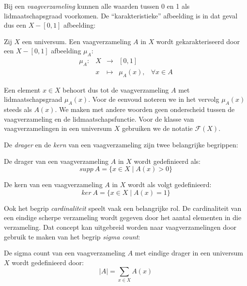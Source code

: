 Bij een \emph{vaagverzameling} kunnen alle waarden tussen 0 en 1 als lidmaatschapsgraad 
voorkomen. De ``karakteristieke'' afbeelding is in dat geval dus een $X - [0,1]$ afbeelding:
\begin{definitie}
Zij $X$ een universum. Een vaagverzameling $A$ in $X$ wordt gekarakteriseerd door een $X - [0,1]$
afbeelding  $\mu_A$:
\begin{displaymath}
\begin{array}{lllll}
\mu_A: 	& X & \to 		& [0,1]	& \\
		& x & \mapsto 	& \mu_A(x),		& \forall x \in A
\end{array}
\end{displaymath}
\end{definitie}
\noindent
Een element $x \in X$ behoort dus tot de vaagverzameling $A$ met lidmaatschapsgraad $\mu_A(x)$.
Voor de eenvoud noteren we in het vervolg $\mu_A(x)$ steeds als $A(x)$. We maken
met andere woorden geen onderscheid tussen de vaagverzameling en de 
lidmaatschapsfunctie. Voor de klasse van vaagverzamelingen in een universum $X$ gebruiken we
de notatie $\mathcal{F}(X)$.

De \emph{drager} en de \emph{kern} van een vaagverzameling zijn twee belangrijke begrippen: 
\begin{definitie}
De drager van een vaagverzameling $A$ in $X$ wordt gedefinieerd als:
\begin{displaymath}
supp\ A = \{x \in X \mid A(x) > 0\} 
\end{displaymath}
\end{definitie}
\begin{definitie}
De kern van een vaagverzameling $A$ in $X$ wordt als volgt gedefinieerd:
\begin{displaymath}
ker\ A = \{x \in X \mid A(x) = 1\}
\end{displaymath}
\end{definitie}
\noindent
Ook het begrip \emph{cardinaliteit} speelt vaak een belangrijke rol. De cardinaliteit van een 
eindige scherpe verzameling wordt gegeven door het aantal elementen in die verzameling. 
Dat concept kan uitgebreid worden naar vaagverzamelingen door gebruik te maken van het begrip 
\emph{sigma count}:
\begin{definitie}
De sigma count van een vaagverzameling $A$ met eindige drager in een universum $X$ wordt
gedefinieerd door:
\begin{displaymath}
|A|=\sum_{x \in X} A(x)
\end{displaymath}
\end{definitie}

